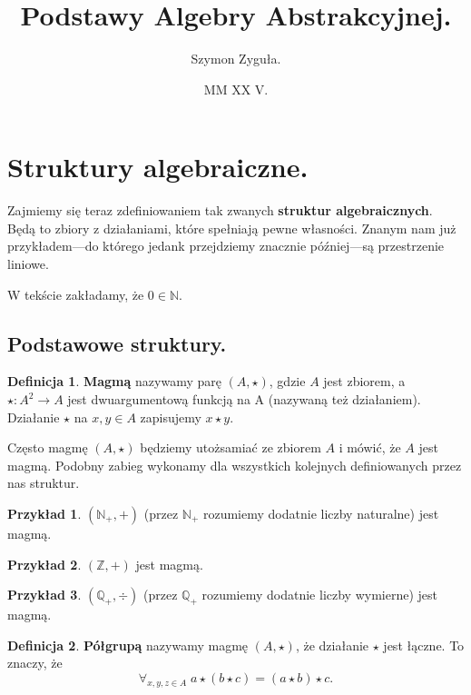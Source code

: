 \documentclass{article}
\date{MM XX V.}
\author{Szymon Zyguła.}
\title{Podstawy Algebry Abstrakcyjnej.}
\theoremstyle{definition}
\newtheorem{definition}{Definicja}[section]
\newtheorem{example}{Przykład}[section]
\begin{document}
\maketitle

\section{Struktury algebraiczne.}

Zajmiemy się teraz zdefiniowaniem tak zwanych \textbf{struktur algebraicznych}.
Będą to zbiory z działaniami, które spełniają pewne własności.
Znanym nam już przykładem---do którego jedank przejdziemy znacznie później---są przestrzenie liniowe.

W tekście zakładamy, że $0 \in \mathbb{N}$.

\subsection{Podstawowe struktury.}

\begin{definition}
	\textbf{Magmą} nazywamy parę $(A, \star)$, gdzie $A$ jest zbiorem, a $\star: A^2 \to A$ jest dwuargumentową funkcją na A (nazywaną też działaniem). Działanie $\star$ na $x, y \in A$ zapisujemy $x \star y$.
\end{definition}
Często magmę $(A, \star)$ będziemy utożsamiać ze zbiorem $A$ i mówić, że $A$ jest magmą.
Podobny zabieg wykonamy dla wszystkich kolejnych definiowanych przez nas struktur.

\begin{example}
	$(\mathbb{N}_+, +)$ (przez $\mathbb{N}_+$ rozumiemy dodatnie liczby naturalne) jest magmą.
\end{example}

\begin{example}
	$(\mathbb{Z}, +)$ jest magmą.
\end{example}

\begin{example}
	$(\mathbb{Q}_+, \div)$ (przez $\mathbb{Q}_+$ rozumiemy dodatnie liczby wymierne) jest magmą.
\end{example}

\begin{definition}
	\textbf{Półgrupą} nazywamy magmę $(A, \star)$, że działanie $\star$ jest łączne. To znaczy, że
	\begin{equation*}
		\forall_{x,y,z \in A}\; a \star (b \star c) = (a \star b) \star c.
	\end{equation*}
\end{definition}
\end{document}
